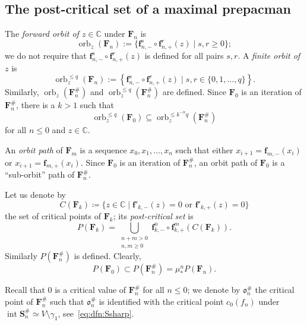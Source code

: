 \documentclass[]{amsart}
\newcommand\intr{\operatorname{int}}
\newcommand{\bF}{{\mathbf F}}
\newcommand{\bS}{{\mathbf S}}
\newcommand{\bbf}{{\mathbf f}}
\newcommand\crt{{\mathfrak o}}
\newcommand{\C}{\mathbb{C}}
\theoremstyle{remark}
\numberwithin{equation}{section}
\theoremstyle{definition}
\newcommand{\orb}{\operatorname{orb}}
\begin{document}
\subsection{The post-critical set of a maximal prepacman}
The \emph{forward orbit of $z\in \C$} under $\bF_n$ is
\[\orb_{z}(\bF_n):= \{\bbf_{n,-}^{s}\circ \bbf^{r}_{n,+}(z)\mid s,r \ge 0\};\]
  we do not require that $\bbf_{n,-}^{s}\circ \bbf^{r}_{n,+}(z)$ is defined for all pairs $ s,r$. A \emph{finite orbit of $z$} is 
 \[\orb_{z}^{\le q}(\bF_{n}):= \left\{\bbf_{n,-}^{s}\circ \bbf^{r}_{n,+}(z)\mid s,r \in \{ 0,1,\dots ,q\}\right\}.\]
 Similarly, $\orb_{z}(\bF^{\#}_n)$ and $\orb_{z}^{\le q}(\bF^{\#}_{n})$ are defined. Since $\bF_0$ is an iteration of $\bF^{\#}_n$, there is a $k>1$ such that \[\orb_{z}^{\le q}(\bF_{0})\subseteq \orb_{z}^{\le k^{-n}q}\left(\bF^{\#}_{n}\right)\]
for all $n\le 0$ and $z\in \C$. 






An \emph{orbit path} of $\bF_{m}$ is a sequence $x_0, x_1,\dots , x_n$ such that either $x_{i+1}=\bbf_{m,-}(x_i)$ or $x_{i+1}=\bbf_{m,+}(x_i)$. Since $\bF_0$ is an iteration of $\bF^{\#}_n$, an orbit path of $\bF_{0}$ is a ``sub-orbit'' path of $\bF^{\#}_{n}$. 



Let us denote by \[C(\bF_{k})\coloneqq \{z\in \C\mid \bbf'_{k,-}(z)=0 \text{ or }\bbf'_{k,+}(z)=0\}\] the set of critical points of $\bF_{k}$; its  \emph{post-critical set} is
\[P(\bF_{k})= \bigcup_{\substack{n+m> 0\\ n,m\ge 0}} \bbf_{k,-}^n\circ \bbf_{k,+}^m (C(\bF_{k})).\]  Similarly $P(\bF^{\#}_{n})$ is defined. Clearly,
\[P(\bF_{0}) \subset P\left(\bF^{\#}_{n}\right) = \mu_*^{n} P(\bF_{n}). \]







 Recall that $0$ is a critical value of $\bF^{\#}_{n}$ for all $n\le 0$; we denote by $\crt_n^{\#}$ the critical point of $\bF^{\#}_n$ such that $\crt_n^{\#}$ is identified with the critical point $c_0(f_n)$ under $\intr \bS^{\#}_n\simeq V\setminus \gamma_1$, see~\eqref{eq:dfn:Ssharp}.  
 
\end{document}
